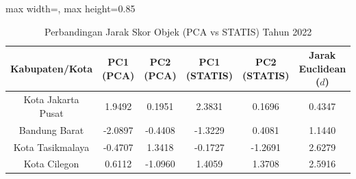 \begin{table}[H]
\centering
\caption{Perbandingan Jarak Skor Objek (PCA vs STATIS) Tahun 2022} \makeatletter{}\makeatother
\begin{adjustbox}{max width=\textwidth, max height=0.85\textheight}
\begin{tabular}{|c|c|c|c|c|c|}
\hline
\textbf{Kabupaten/Kota} & \textbf{PC1 (PCA)} & \textbf{PC2 (PCA)} & \textbf{PC1 (STATIS)} & \textbf{PC2 (STATIS)} & \textbf{Jarak Euclidean ($d$)} \\
\hline
Kota Jakarta Pusat & 1.9492 & 0.1951 & 2.3831 & 0.1696 & 0.4347 \\
Bandung Barat & -2.0897 & -0.4408 & -1.3229 & 0.4081 & 1.1440 \\
Kota Tasikmalaya & -0.4707 & 1.3418 & -0.1727 & -1.2691 & 2.6279 \\
Kota Cilegon & 0.6112 & -1.0960 & 1.4059 & 1.3708 & 2.5916 \\
\hline
\end{tabular}
\end{adjustbox}
\end{table}